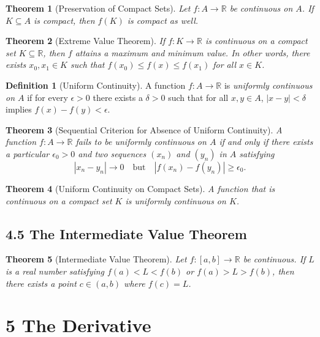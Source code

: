 \documentclass{amsart}
\newtheorem*{theorem}{Theorem}
\theoremstyle{definition}
\newtheorem*{definition}{Definition}
\newcommand{\R}{\mathbb{R}}
\newcommand{\abs}[1]{|#1|}
\begin{document}
\begin{theorem}[Preservation of Compact Sets]
  Let $f : A \to \R$ be continuous on $A$. If $K \subseteq A$ is compact, then
  $f(K)$ is compact as well.
\end{theorem}

\begin{theorem}[Extreme Value Theorem]
  If $f : K \to \R$ is continuous on a compact set $K \subseteq \R$, then $f$
  attains a maximum and minimum value. In other words, there exists $x_0, x_1
  \in K$ such that $f(x_0) \le f(x) \le f(x_1)$ for all $x \in K$.
\end{theorem}

\begin{definition}[Uniform Continuity]
  A function $f : A \to \R$ is \emph{uniformly continuous on $A$} if for every
  $\epsilon > 0$ there exists a $\delta > 0$ such that for all $x, y \in A$,
  $\abs{x - y} < \delta$ implies $f(x) - f(y) < \epsilon$.
\end{definition}

\begin{theorem}[Sequential Criterion for Absence of Uniform Continuity]
  A function $f : A \to \R$ fails to be uniformly continuous on $A$ if and only
  if there exists a particular $\epsilon_0 > 0$ and two sequences $(x_n)$ and
  $(y_n)$ in $A$ satisfying
  \[
    \abs{x_n - y_n} \to 0 \quad \text{but} \quad \abs{f(x_n) - f(y_n)} \ge
    \epsilon_0.
  \]
\end{theorem}

\begin{theorem}[Uniform Continuity on Compact Sets]
  A function that is continuous on a compact set $K$ is uniformly continuous on
  $K$.
\end{theorem}

\subsection*{4.5 The Intermediate Value Theorem}

\begin{theorem}[Intermediate Value Theorem]
  Let $f : [a, b] \to \R$ be continuous. If $L$ is a real number satisfying
  $f(a) < L < f(b)$ or $f(a) > L > f(b)$, then there exists a point $c \in (a,
  b)$ where $f(c) = L$.
\end{theorem}

\section*{5 The Derivative}
\end{document}
